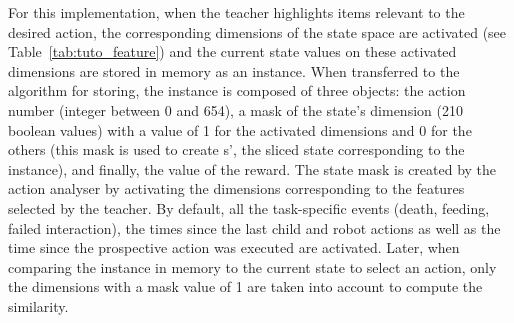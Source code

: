 For this implementation, when the teacher highlights items relevant to the desired action, the corresponding dimensions of the state space are activated (see Table~\ref{tab:tuto_feature}) and the current state values on these activated dimensions are stored in memory as an instance. %
When transferred to the algorithm for storing, the instance is composed of three objects: the action number (integer between 0 and 654), a mask of the state's dimension (210 boolean values) with a value of 1 for the activated dimensions and 0 for the others (this mask is used to create s', the sliced state corresponding to the instance), and finally, the value of the reward. The state mask is created by the action analyser by activating the dimensions corresponding to the features selected by the teacher. By default, all the task-specific events (death, feeding, failed interaction), the times since the last child and robot actions as well as the time since the prospective action was executed are activated. Later, when comparing the instance in memory to the current state to select an action, only the dimensions with a mask value of 1 are taken into account to compute the similarity.





